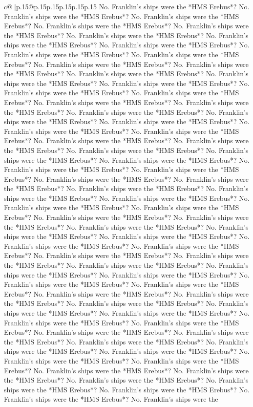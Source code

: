 \documentclass{article}
\begin{document}
{\begin{supertabular}{c@{$\;$}|p{.15\linewidth}@{}p{.15\linewidth}p{.15\linewidth}p{.15\linewidth}p{.15\linewidth}p{.15\linewidth}}
{{{No. Franklin's ships were the *HMS Erebus*? No. Franklin's ships were the *HMS Erebus*? No. Franklin's ships were the *HMS Erebus*? No. Franklin's ships were the *HMS Erebus*? No. Franklin's ships were the *HMS Erebus*? No. Franklin's ships were the *HMS Erebus*? No. Franklin's ships were the *HMS Erebus*? No. Franklin's ships were the *HMS Erebus*? No. Franklin's ships were the *HMS Erebus*? No. Franklin's ships were the *HMS Erebus*? No. Franklin's ships were the *HMS Erebus*? No. Franklin's ships were the *HMS Erebus*? No. Franklin's ships were the *HMS Erebus*? No. Franklin's ships were the *HMS Erebus*? No. Franklin's ships were the *HMS Erebus*? No. Franklin's ships were the *HMS Erebus*? No. Franklin's ships were the *HMS Erebus*? No. Franklin's ships were the *HMS Erebus*? No. Franklin's ships were the *HMS Erebus*? No. Franklin's ships were the *HMS Erebus*? No. Franklin's ships were the *HMS Erebus*? No. Franklin's ships were the *HMS Erebus*? No. Franklin's ships were the *HMS Erebus*? No. Franklin's ships were the *HMS Erebus*? No. Franklin's ships were the *HMS Erebus*? No. Franklin's ships were the *HMS Erebus*? No. Franklin's ships were the *HMS Erebus*? No. Franklin's ships were the *HMS Erebus*? No. Franklin's ships were the *HMS Erebus*? No. Franklin's ships were the *HMS Erebus*? No. Franklin's ships were the *HMS Erebus*? No. Franklin's ships were the *HMS Erebus*? No. Franklin's ships were the *HMS Erebus*? No. Franklin's ships were the *HMS Erebus*? No. Franklin's ships were the *HMS Erebus*? No. Franklin's ships were the *HMS Erebus*? No. Franklin's ships were the *HMS Erebus*? No. Franklin's ships were the *HMS Erebus*? No. Franklin's ships were the *HMS Erebus*? No. Franklin's ships were the *HMS Erebus*? No. Franklin's ships were the *HMS Erebus*? No. Franklin's ships were the *HMS Erebus*? No. Franklin's ships were the *HMS Erebus*? No. Franklin's ships were the *HMS Erebus*? No. Franklin's ships were the *HMS Erebus*? No. Franklin's ships were the *HMS Erebus*? No. Franklin's ships were the *HMS Erebus*? No. Franklin's ships were the *HMS Erebus*? No. Franklin's ships were the *HMS Erebus*? No. Franklin's ships were the *HMS Erebus*? No. Franklin's ships were the *HMS Erebus*? No. Franklin's ships were the *HMS Erebus*? No. Franklin's ships were the *HMS Erebus*? No. Franklin's ships were the *HMS Erebus*? No. Franklin's ships were the *HMS Erebus*? No. Franklin's ships were the *HMS Erebus*? No. Franklin's ships were the *HMS Erebus*? No. Franklin's ships were the *HMS Erebus*? No. Franklin's ships were the *HMS Erebus*? No. Franklin's ships were the *HMS Erebus*? No. Franklin's ships were the *HMS Erebus*? No. Franklin's ships were the *HMS Erebus*? No. Franklin's ships were the *HMS Erebus*? No. Franklin's ships were the *HMS Erebus*? No. Franklin's ships were the *HMS Erebus*? No. Franklin's ships were the *HMS Erebus*? No. Franklin's ships were the *HMS Erebus*? No. Franklin's ships were the *HMS Erebus*? No. Franklin's ships were the *HMS Erebus*? No. Franklin's ships were the *HMS Erebus*? No. Franklin's ships were the *HMS Erebus*? No. Franklin's ships were the *HMS Erebus*? No. Franklin's ships were the }}}
\end{supertabular}}
\end{document}
